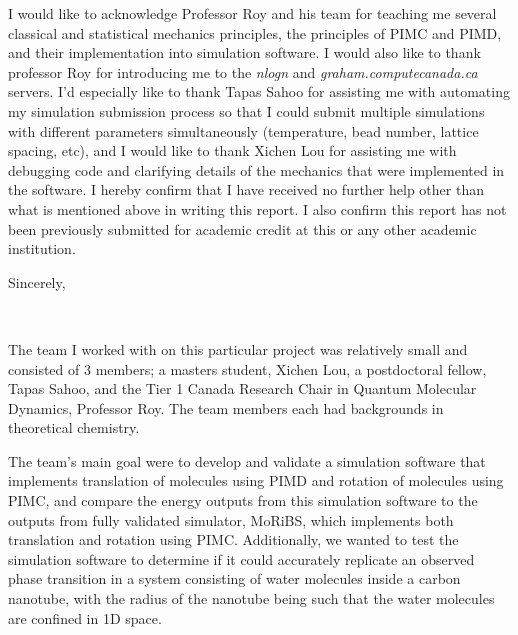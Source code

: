 \documentclass{ece}
\begin{document}
I would like to acknowledge Professor Roy and his team for teaching me several classical and statistical mechanics principles, the principles of \gls{PIMC} and \gls{PIMD}, and their implementation into simulation software. I would also like to thank professor Roy for introducing me to the \textit{nlogn} and \textit{graham.computecanada.ca} servers. I'd especially like to thank Tapas Sahoo for assisting me with automating my simulation submission process so that I could submit multiple simulations with different parameters simultaneously (temperature, bead number, lattice spacing, etc), and I would like to thank Xichen Lou for assisting me with debugging code and clarifying details of the mechanics that were implemented in the software. I hereby confirm that I have received no further help other than what is mentioned above in writing this report. I also confirm this report has not been previously submitted for academic credit at this or any other academic institution. 

Sincerely,
\vspace*{6\baselineskip}

\printauthorname\\
\printstudentnumber


\contributions

The team I worked with on this particular project was relatively small and consisted of 3 members; a masters student, Xichen Lou, a postdoctoral fellow, Tapas Sahoo, and the Tier 1 Canada Research Chair in Quantum Molecular Dynamics, Professor Roy. The team members each had backgrounds in theoretical chemistry. 

The team's main goal were to develop and validate a simulation software that implements translation of molecules using \gls{PIMD} and rotation of molecules using \gls{PIMC}, and compare the energy outputs from this simulation software to the outputs from fully validated simulator, \gls{MoRiBS}, which implements both translation and rotation using \gls{PIMC}. Additionally, we wanted to test the simulation software to determine if it could accurately replicate an observed phase transition in a system consisting of water molecules inside a carbon nanotube, with the radius of the nanotube being such that the water molecules are confined in 1D space. 
\end{document}
